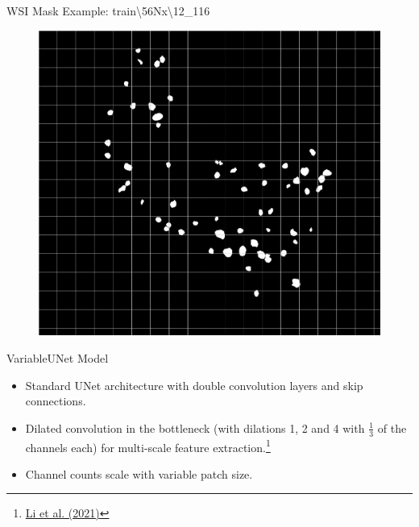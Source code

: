 \documentclass{beamer}
\begin{document}
\begin{frame}{WSI Mask Example: train\textbackslash56Nx\textbackslash12\_116}
    \begin{figure}
        \vspace{-0.14cm}
        \centering
        \includegraphics[height=0.877\textheight]{Images/mask_thumbnail_with_grid.png}
    \end{figure}

\end{frame}

\begin{frame}{VariableUNet Model}
    \begin{itemize}
        \item Standard UNet architecture with double convolution layers and skip connections.
        \item Dilated convolution in the bottleneck (with dilations 1, 2 and 4 with $\frac{1}{3}$ of the channels each) for multi-scale feature extraction.\footnote{\href{https://doi.org/10.1117/1.JMI.8.6.067501}{Li et al. (2021)}}
        \item Channel counts scale with variable patch size.
    \end{itemize}
    
        
\end{frame}
\end{document}
